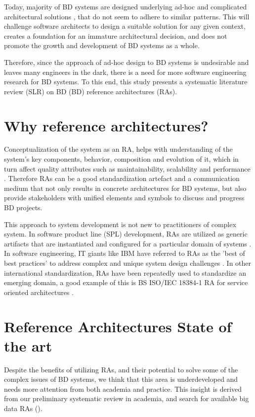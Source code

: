 \documentclass{ieeeaccess}
\begin{document}
Today, majority of BD systems are designed underlying ad-hoc and complicated architectural solutions \cite{Gorton}, that do not seem to adhere to similar patterns. This will challenge software architects to design a suitable solution for any given context, creates a foundation for an immature architectural decision, and does not promote the growth and development of BD systems as a whole. 

Therefore, since the approach of ad-hoc design to BD systems is undesirable and leaves many engineers in the dark, there is a need for more software engineering research for BD systems. To this end, this study presents a systematic literature review (SLR) on BD (BD) reference architectures (RAs). 

\section{Why reference architectures?}
Conceptualization of the system as an RA, helps with understanding of the system’s key components, behavior, composition and evolution of it, which in turn affect quality attributes such as maintainability, scalability and performance \cite{Cloutier}. Therefore RAs can be a good standardization artefact and a communication medium that not only results in concrete architectures for BD systems, but also provide stakeholders with unified elements and symbols to discuss and progress BD projects.

This approach to system development is not new to practitioners of complex system. In software product line (SPL) development, RAs are utilized as generic artifacts that are instantiated and configured for a particular domain of systems \cite{Derras}. In software engineering, IT giants like IBM have referred to RAs as the 'best of best practices' to address complex and unique system design challenges \cite{Cloutier}. In other international standardization, RAs have been repeatedly used to standardize an emerging domain, a good example of this is BS ISO/IEC 18384-1 RA for service oriented architectures \cite{Iso18384-1}. 

\section{Reference Architectures State of the art}

Despite the benefits of utilizing RAs, and their potential to solve some of the complex issues of BD systems, we think that this area is underdeveloped and needs more attention from both academia and practice. This insight is derived from our preliminary systematic review in academia, and search for available big data RAs (\cite{AtaeiACIS}).
\end{document}
